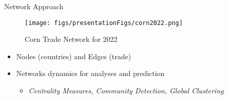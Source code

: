 \documentclass[10pt,xcolor={dvipsnames}]{beamer}
\begin{document}
\begin{frame}{Network Approach}
    \begin{figure}
        \centering
         \texttt{[image: figs/presentationFigs/corn2022.png]}
         \caption*{\tiny  Corn Trade Network for 2022}
    \end{figure}
\vspace{-20pt}
\footnotesize
         \begin{itemize}\itemsep1pt
             \item[\ding{213}] Nodes (countries) and Edges (trade) 
             \item[\ding{213}] Networks dynamics for analyses and prediction 
             \begin{itemize}
             \scriptsize
                 \item \textit{Centrality Measures, Community Detection, Global Clustering}
             \end{itemize}
         \end{itemize}
\end{frame}
\end{document}
